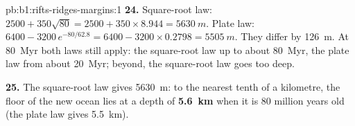\begin{solution}{pb:b1:rifts-ridges-margins:1}
\textbf{24.} Square-root law: $2500 + 350\sqrt{80} = 2500 + 350\times8.944 =
\qty{5630}{m}$. Plate law: $6400 - 3200\,e^{-80/62.8} = 6400 - 3200\times0.2798
= \qty{5505}{m}$. They differ by \qty{126}{m}. At \qty{80}{Myr} both laws still
apply: the square-root law up to about \qty{80}{Myr}, the plate law from about
\qty{20}{Myr}; beyond, the square-root law goes too deep.

\textbf{25.} The square-root law gives \qty{5630}{m}: to the nearest tenth of a
kilometre, the floor of the new ocean lies at a depth of
\textbf{\qty[text-series-to-math=true]{5.6}{km}} when it is 80 million years
old (the plate law gives \qty{5.5}{km}).
\end{solution}
